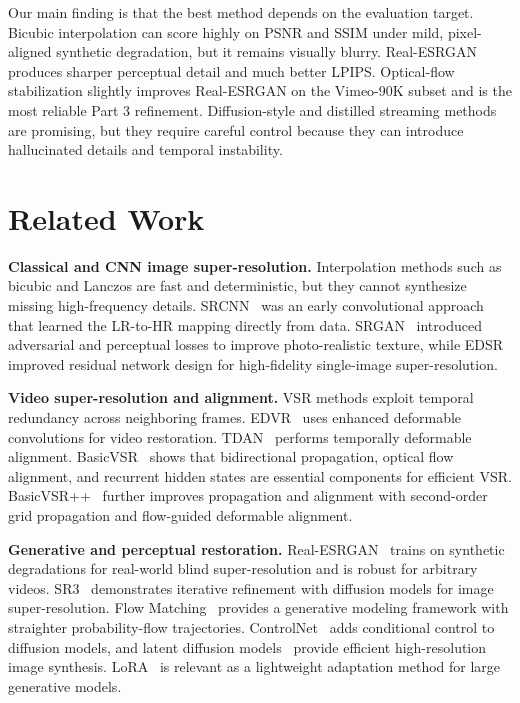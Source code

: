 \documentclass[10pt,twocolumn,letterpaper]{article}
\begin{document}
Our main finding is that the best method depends on the evaluation target. Bicubic interpolation can score highly on PSNR and SSIM under mild, pixel-aligned synthetic degradation, but it remains visually blurry. Real-ESRGAN produces sharper perceptual detail and much better LPIPS. Optical-flow stabilization slightly improves Real-ESRGAN on the Vimeo-90K subset and is the most reliable Part 3 refinement. Diffusion-style and distilled streaming methods are promising, but they require careful control because they can introduce hallucinated details and temporal instability.

\section{Related Work}

\noindent\textbf{Classical and CNN image super-resolution.}
Interpolation methods such as bicubic and Lanczos are fast and deterministic, but they cannot synthesize missing high-frequency details. SRCNN~\cite{dong2015srcnn} was an early convolutional approach that learned the LR-to-HR mapping directly from data. SRGAN~\cite{ledig2017srgan} introduced adversarial and perceptual losses to improve photo-realistic texture, while EDSR~\cite{lim2017edsr} improved residual network design for high-fidelity single-image super-resolution.

\noindent\textbf{Video super-resolution and alignment.}
VSR methods exploit temporal redundancy across neighboring frames. EDVR~\cite{wang2019edvr} uses enhanced deformable convolutions for video restoration. TDAN~\cite{tian2020tdan} performs temporally deformable alignment. BasicVSR~\cite{chan2021basicvsr} shows that bidirectional propagation, optical flow alignment, and recurrent hidden states are essential components for efficient VSR. BasicVSR++~\cite{chan2022basicvsrpp} further improves propagation and alignment with second-order grid propagation and flow-guided deformable alignment.

\noindent\textbf{Generative and perceptual restoration.}
Real-ESRGAN~\cite{wang2021realesrgan} trains on synthetic degradations for real-world blind super-resolution and is robust for arbitrary videos. SR3~\cite{saharia2022sr3} demonstrates iterative refinement with diffusion models for image super-resolution. Flow Matching~\cite{lipman2023flowmatching} provides a generative modeling framework with straighter probability-flow trajectories. ControlNet~\cite{zhang2023controlnet} adds conditional control to diffusion models, and latent diffusion models~\cite{rombach2022ldm} provide efficient high-resolution image synthesis. LoRA~\cite{hu2022lora} is relevant as a lightweight adaptation method for large generative models.
\end{document}
